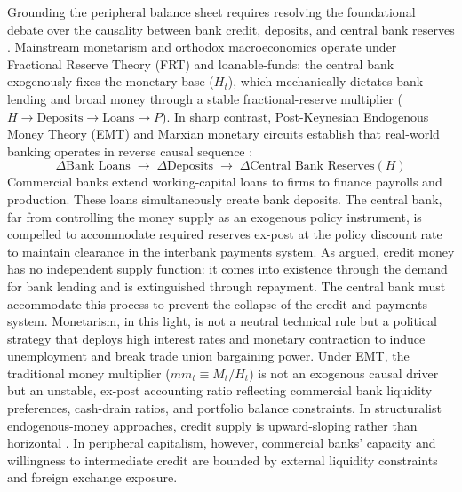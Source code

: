 Grounding the peripheral balance sheet requires resolving the foundational debate over the causality between bank credit, deposits, and central bank reserves \citep{RochonRossi2013,Lavoie2014}. Mainstream monetarism and orthodox macroeconomics operate under Fractional Reserve Theory (FRT) and loanable-funds: the central bank exogenously fixes the monetary base ($H_t$), which mechanically dictates bank lending and broad money through a stable fractional-reserve multiplier ($H \to \text{Deposits} \to \text{Loans} \to P$). In sharp contrast, Post-Keynesian Endogenous Money Theory (EMT) and Marxian monetary circuits establish that real-world banking operates in reverse causal sequence \citep{Kaldor1982,Lavoie2014}:
\begin{equation}
	\Delta \text{Bank Loans} \;\longrightarrow\; \Delta \text{Deposits} \;\longrightarrow\; \Delta \text{Central Bank Reserves} (H)
	\label{eq:endogenous_money_sequence}
\end{equation}
Commercial banks extend working-capital loans to firms to finance payrolls and production. These loans simultaneously create bank deposits. The central bank, far from controlling the money supply as an exogenous policy instrument, is compelled to accommodate required reserves ex-post at the policy discount rate to maintain clearance in the interbank payments system. As \citet{Kaldor1982} argued, credit money has no independent supply function: it comes into existence through the demand for bank lending and is extinguished through repayment. The central bank must accommodate this process to prevent the collapse of the credit and payments system. Monetarism, in this light, is not a neutral technical rule but a political strategy that deploys high interest rates and monetary contraction to induce unemployment and break trade union bargaining power. Under EMT, the traditional money multiplier ($mm_t \equiv M_t / H_t$) is not an exogenous causal driver but an unstable, ex-post accounting ratio reflecting commercial bank liquidity preferences, cash-drain ratios, and portfolio balance constraints. In structuralist endogenous-money approaches, credit supply is upward-sloping rather than horizontal \citep{Dow2006,Rochon1999}. In peripheral capitalism, however, commercial banks' capacity and willingness to intermediate credit are bounded by external liquidity constraints and foreign exchange exposure.

